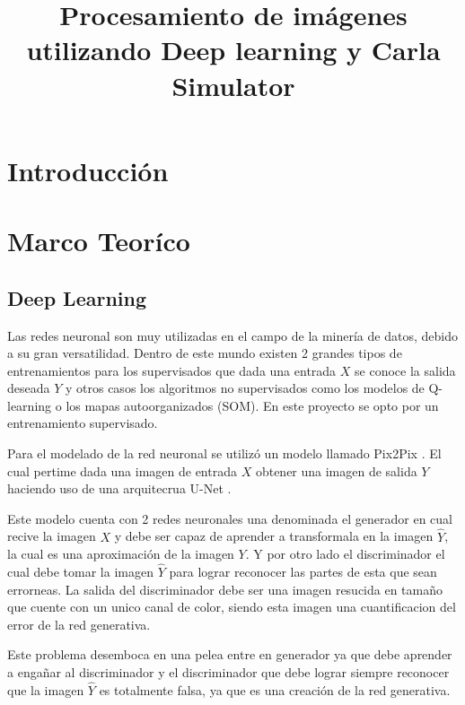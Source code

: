 \documentclass[]{IEEEtran}
\title{Procesamiento de imágenes utilizando Deep learning y Carla 
Simulator}
\author{}
\date{}
\begin{document}
    \maketitle

    \begin{abstract}
        
    \end{abstract}

    \section{Introducción}

    \section{Marco Teoríco}

    \subsection{Deep Learning}

    Las redes neuronal son muy utilizadas en el campo de la minería de datos, debido a 
    su gran versatilidad. Dentro de este mundo existen 2 grandes tipos de entrenamientos 
    para los supervisados que dada una entrada $X$ se conoce la salida deseada $Y$ y 
    otros casos los algoritmos no supervisados como los modelos de Q-learning o los mapas autoorganizados (SOM).
    En este proyecto se opto por un entrenamiento supervisado.

    Para el modelado de la red neuronal se utilizó un modelo llamado Pix2Pix \cite{Pix2Pix}.
    El cual pertime dada una imagen de entrada $X$ obtener una imagen de salida $Y$ haciendo uso 
    de una arquitecrua U-Net \cite{U-Net}. 
    
    Este modelo cuenta con 2 redes neuronales una denominada 
    el generador en cual recive la imagen $X$ y debe ser capaz de aprender a transformala en la imagen $\hat{Y}$, la cual es 
    una aproximación de la imagen $Y$.
    Y por otro lado el discriminador el cual debe tomar la imagen $\hat{Y}$ para lograr reconocer las partes de 
    esta que sean errorneas. La salida del discriminador debe ser una imagen resucida en tamaño que cuente con 
    un unico canal de color, siendo esta imagen una cuantificacion del error de la red generativa.

    Este problema desemboca en una pelea entre en generador ya que debe aprender a engañar al discriminador 
    y el discriminador que debe lograr siempre reconocer que la imagen $\hat{Y}$ es totalmente falsa, ya que es una 
    creación de la red generativa.
\end{document}
